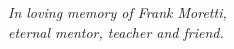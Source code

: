 %

\vspace*{\fill}
\begin{center}
      \emph{In loving memory of Frank Moretti,\\
      		\hspace{7ex}eternal mentor, teacher and friend.}
\end{center}
\vspace*{\fill}

